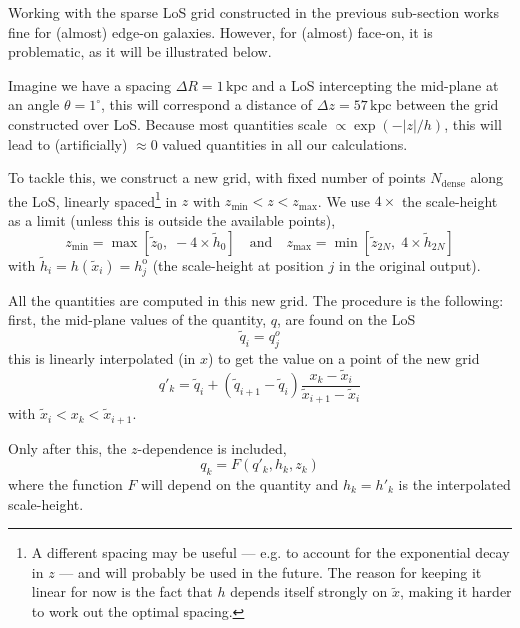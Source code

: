 \documentclass[a4paper,10pt]{article}
\newcommand{\degree}{^\circ}
\newcommand{\kpc}{\,\text{kpc}}  %
\begin{document}
Working with the sparse LoS grid constructed in the previous sub-section works fine
for (almost) edge-on galaxies. However, for (almost) face-on, it is problematic,
as it will be illustrated below.

Imagine we have a spacing $\Delta R=1\kpc$ and a LoS intercepting the mid-plane at
an angle $\theta=1\degree$, this will correspond a distance of $\Delta z = 57\kpc$
between the grid constructed over LoS. Because most quantities scale
$\propto\exp(-|z|/h)$, this will lead to (artificially) $\approx\!0$ valued
quantities in all our calculations.

To tackle this, we construct a new grid, with fixed number of points $N_\text{dense}$
along the LoS, linearly spaced\footnote{A different spacing may be useful --- e.g.
to account for the exponential decay in $z$ --- and will probably be used in the future.
The reason for keeping it linear for now is the fact that $h$ depends itself strongly on
$\widetilde x$, making it harder to work out the optimal spacing.}
in $z$ with $z_\text{min}<z<z_\text{max}$. We use $4\times$
the scale-height as a limit (unless this is outside the available points),
\begin{equation}
 z_\text{min} = \max\left[\widetilde z_0,\; -4\times \widetilde h_0\right]
 \quad\text{and}\quad
 z_\text{max} = \min\left[\widetilde z_{2N},\; 4\times \widetilde h_{2N}\right]
\end{equation}
with $\widetilde h_i = h(\widetilde x_i) = h^\text{o}_j$ (the scale-height at position $j$ in
the original output).

All the quantities are computed in this new grid. The procedure is the following:
first, the mid-plane values of the quantity, $q$, are found on the LoS
\begin{equation}
  \widetilde q_i = q^{o}_j
\end{equation}
this is linearly interpolated (in $x$) to get the value on a point of the new grid
\begin{equation}
 q'_k =  \widetilde q_i + \left(\widetilde q_{i+1}-\widetilde q_i\right) \frac{x_k - \widetilde x_i}{\widetilde  x_{i+1}-\widetilde x_i}
\label{eq:interp}
\end{equation}
with $\widetilde x_i < x_k < \widetilde x_{i+1}$.

Only after this, the $z$-dependence is included,
\begin{equation}
 q_k = F(q'_k, h_k, z_k)
\end{equation}
where the function $F$ will depend on the quantity and $h_k=h'_k$ is the interpolated
scale-height.
\end{document}
